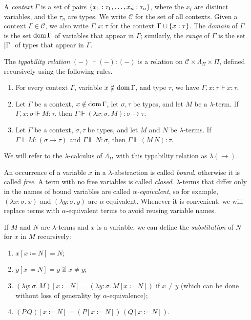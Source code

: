 A \emph{context} \( \Gamma \) is a set of pairs \( \qty{x_1 : \tau_1, \dots, x_n : \tau_n} \), where the \( x_i \) are distinct variables, and the \( \tau_n \) are types.
We write \( \mathcal C \) for the set of all contexts.
Given a context \( \Gamma \in \mathcal C \), we also write \( \Gamma, x : \tau \) for the context \( \Gamma \cup \qty{x : \tau} \).
The \emph{domain} of \( \Gamma \) is the set \( \operatorname{dom} \Gamma \) of variables that appear in \( \Gamma \); similarly, the \emph{range} of \( \Gamma \) is the set \( \abs{\Gamma} \) of types that appear in \( \Gamma \).

The \emph{typability relation} \( (-) \Vdash (-) : (-) \) is a relation on \( \mathcal C \times \Lambda_\Pi \times \Pi \), defined recursively using the following rules.
\begin{enumerate}
    \item For every context \( \Gamma \), variable \( x \notin \operatorname{dom} \Gamma \), and type \( \tau \), we have \( \Gamma, x : \tau \Vdash x : \tau \).
    \item Let \( \Gamma \) be a context, \( x \notin \operatorname{dom} \Gamma \), let \( \sigma, \tau \) be types, and let \( M \) be a \( \lambda \)-term.
    If \( \Gamma, x : \sigma \Vdash M : \tau \), then \( \Gamma \Vdash (\lambda x : \sigma.\, M) : \sigma \to \tau \).
    \item Let \( \Gamma \) be a context, \( \sigma, \tau \) be types, and let \( M \) and \( N \) be \( \lambda \)-terms.
    If \( \Gamma \Vdash M : (\sigma \to \tau) \) and \( \Gamma \Vdash N : \sigma \), then \( \Gamma \Vdash (M\, N) : \tau \).
\end{enumerate}
We will refer to the \( \lambda \)-calculus of \( \Lambda_\Pi \) with this typability relation as \( \lambda(\to) \).

An occurrence of a variable \( x \) in a \( \lambda \)-abstraction is called \emph{bound}, otherwise it is called \emph{free}.
A term with no free variables is called \emph{closed}.
\( \lambda \)-terms that differ only in the names of bound variables are called \emph{\( \alpha \)-equivalent}, so for example, \( (\lambda x:\sigma.\, x) \) and \( (\lambda y:\sigma.\, y) \) are \( \alpha \)-equivalent.
Whenever it is convenient, we will replace terms with \( \alpha \)-equivalent terms to avoid reusing variable names.

If \( M \) and \( N \) are \( \lambda \)-terms and \( x \) is a variable, we can define the \emph{substitution} of \( N \) for \( x \) in \( M \) recursively:
\begin{enumerate}
    \item \( x[x \coloneq N] = N \);
    \item \( y[x \coloneq N] = y \) if \( x \neq y \);
    \item \( (\lambda y : \sigma.\, M)[x \coloneq N] = (\lambda y:\sigma.\, M[x \coloneq N]) \) if \( x \neq y \) (which can be done without loss of generality by \( \alpha \)-equivalence);
    \item \( (P\, Q)[x \coloneq N] = (P[x \coloneq N])\, (Q[x \coloneq N]) \).
\end{enumerate}

